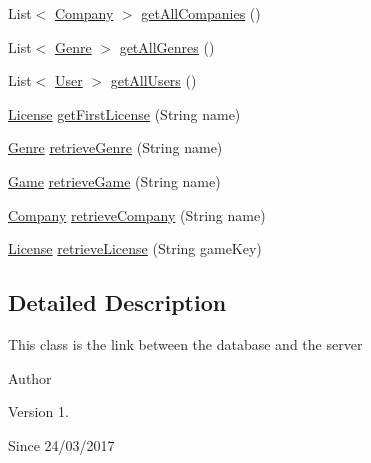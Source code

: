 \begin{DoxyCompactItemize}
\item 
List$<$ \hyperlink{classes_1_1deusto_1_1server_1_1db_1_1data_1_1_company}{Company} $>$ \hyperlink{classes_1_1deusto_1_1server_1_1db_1_1dao_1_1_d_a_o_ac564970c7e308393497e874655470aaa}{get\+All\+Companies} ()
\item 
List$<$ \hyperlink{classes_1_1deusto_1_1server_1_1db_1_1data_1_1_genre}{Genre} $>$ \hyperlink{classes_1_1deusto_1_1server_1_1db_1_1dao_1_1_d_a_o_ac1cb7032ef21f53dead8347ef440f431}{get\+All\+Genres} ()
\item 
List$<$ \hyperlink{classes_1_1deusto_1_1server_1_1db_1_1data_1_1_user}{User} $>$ \hyperlink{classes_1_1deusto_1_1server_1_1db_1_1dao_1_1_d_a_o_a9c59f6c4bf89f46e305f88a4f8eb96bc}{get\+All\+Users} ()
\item 
\hyperlink{classes_1_1deusto_1_1server_1_1db_1_1data_1_1_license}{License} \hyperlink{classes_1_1deusto_1_1server_1_1db_1_1dao_1_1_d_a_o_a4a5a54059bac00ea6f3b6d21f2a31a02}{get\+First\+License} (String name)
\item 
\hyperlink{classes_1_1deusto_1_1server_1_1db_1_1data_1_1_genre}{Genre} \hyperlink{classes_1_1deusto_1_1server_1_1db_1_1dao_1_1_d_a_o_a16b0af798fbb00cd29a505491c57e2cd}{retrieve\+Genre} (String name)
\item 
\hyperlink{classes_1_1deusto_1_1server_1_1db_1_1data_1_1_game}{Game} \hyperlink{classes_1_1deusto_1_1server_1_1db_1_1dao_1_1_d_a_o_ac94a91d3e5aeeb98fc12f087532b3506}{retrieve\+Game} (String name)
\item 
\hyperlink{classes_1_1deusto_1_1server_1_1db_1_1data_1_1_company}{Company} \hyperlink{classes_1_1deusto_1_1server_1_1db_1_1dao_1_1_d_a_o_aabd374b169473cfd6e1bdc4efc89b177}{retrieve\+Company} (String name)
\item 
\hyperlink{classes_1_1deusto_1_1server_1_1db_1_1data_1_1_license}{License} \hyperlink{classes_1_1deusto_1_1server_1_1db_1_1dao_1_1_d_a_o_a02fd634e6bd7a087b1476ab161af646f}{retrieve\+License} (String game\+Key)
\end{DoxyCompactItemize}


\subsection{Detailed Description}
This class is the link between the database and the server \begin{DoxyAuthor}{Author}

\end{DoxyAuthor}
\begin{DoxyVersion}{Version}
1. 
\end{DoxyVersion}
\begin{DoxySince}{Since}
24/03/2017 
\end{DoxySince}



